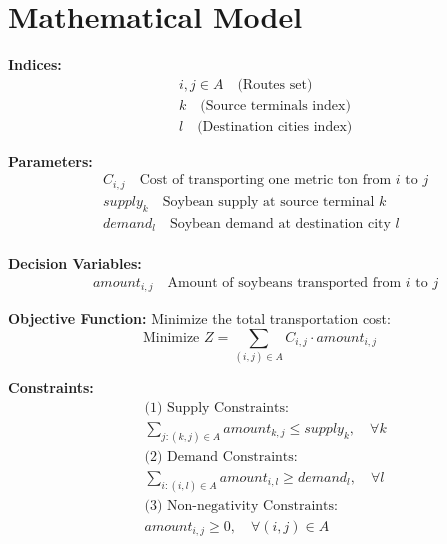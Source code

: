 \documentclass{article}
\begin{document}
\section*{Mathematical Model}

\textbf{Indices:}
\begin{align*}
& i, j \in A \quad \text{(Routes set)} \\
& k \quad \text{(Source terminals index)} \\
& l \quad \text{(Destination cities index)} 
\end{align*}

\textbf{Parameters:}
\begin{align*}
& C_{i,j} \quad \text{Cost of transporting one metric ton from } i \text{ to } j \\
& supply_{k} \quad \text{Soybean supply at source terminal } k \\
& demand_{l} \quad \text{Soybean demand at destination city } l \\
\end{align*}

\textbf{Decision Variables:}
\begin{align*}
& amount_{i,j} \quad \text{Amount of soybeans transported from } i \text{ to } j 
\end{align*}

\textbf{Objective Function:}
Minimize the total transportation cost:
\[
\text{Minimize } Z = \sum_{(i,j) \in A} C_{i,j} \cdot amount_{i,j}
\]

\textbf{Constraints:}
\begin{align*}
& \text{(1) Supply Constraints:} \\
& \sum_{j:(k,j) \in A} amount_{k,j} \leq supply_{k}, \quad \forall k \\
& \text{(2) Demand Constraints:} \\
& \sum_{i:(i,l) \in A} amount_{i,l} \geq demand_{l}, \quad \forall l \\
& \text{(3) Non-negativity Constraints:} \\
& amount_{i,j} \geq 0, \quad \forall (i,j) \in A 
\end{align*}
\end{document}
